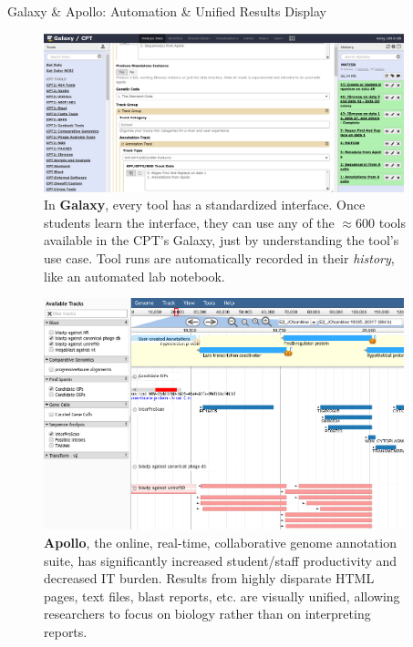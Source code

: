 \documentclass[final,t]{beamer}
\begin{document}
\begin{frame}[fragile]
\begin{columns}[t]
\begin{column}{.36\linewidth}
        \end{column}
        \begin{column}{.60\linewidth}
            \begin{block}{Galaxy \& Apollo: Automation \& Unified Results Display}
                \begin{figure}
                    \includegraphics[width=0.98\textwidth]{./media/galaxy.png}\vspace{1ex}
                    \caption{In \textbf{Galaxy}, every tool has a standardized
                        interface. Once students learn the interface, they can
                        use any of the $\approx$600 tools available in the
                        CPT's Galaxy, just by understanding the tool's use
                        case. Tool runs are automatically recorded in their
                        \emph{history}, like an automated lab notebook.}
                \end{figure}
                \begin{figure}
                    \includegraphics[width=0.98\textwidth]{./media/apollo.png}\vspace{1ex}
                    \caption{\textbf{Apollo}, the online, real-time,
                    collaborative genome annotation suite, has significantly
                    increased student/staff productivity and
                    decreased IT burden. Results from highly disparate HTML
                    pages, text files, blast reports, etc. are visually
                    unified, allowing researchers to focus on biology rather
                    than on interpreting reports.}
                \end{figure}


\end{block}
\end{column}
\end{columns}
\end{frame}
\end{document}
